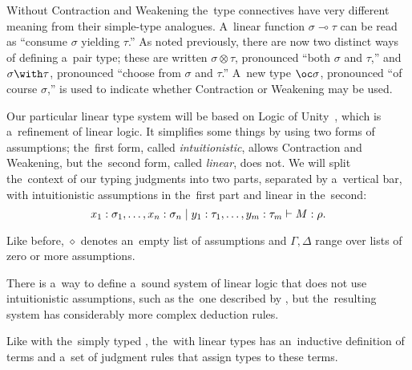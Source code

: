 Without Contraction and Weakening the~type connectives have very different
meaning from their simple-type analogues. A~linear function $\sigma \multimap
\tau$ can be read as ``consume $\sigma$ yielding $\tau$.'' As noted previously,
there are now two distinct ways of defining a~pair type; these are written
$\sigma \otimes \tau$, pronounced ``both $\sigma$ and $\tau$,'' and $\sigma
\with \tau$, pronounced ``choose from $\sigma$ and $\tau$.'' A~new type
$\oc \sigma$, pronounced ``of course $\sigma$,'' is used to indicate whether
Contraction or Weakening may be used.


Our particular linear type system will be based on Logic of
Unity~\citep{girard_1993}, which is a~refinement of linear logic. It simplifies
some things by using two forms of assumptions; the~first form, called
\emph{intuitionistic}, allows Contraction and Weakening, but the~second form,
called \emph{linear}, does not. We will split the~context of our typing
judgments into two parts, separated by a~vertical bar, with intuitionistic
assumptions in the~first part and linear in the~second:
\[
  x_1 \overset{}: \sigma_1, \dotsc, x_n \overset{}: \sigma_n \mid y_1 \overset{}: \tau_1, \dotsc,
    y_m \overset{}: \tau_m \vdash M \overset{}: \rho.
\]

Like before, $\diamond$ denotes an~empty list of assumptions and $\Gamma,
\Delta$ range over lists of zero or more assumptions.

There is a~way to define a~sound system of linear logic that does not use
intuitionistic assumptions, such as the~one described by
\citet{benton_et_al_1993}, but the~resulting system has considerably more
complex deduction rules.

Like with the~simply typed \lc, the~\lc with linear types has an~inductive
definition of terms and a~set of judgment rules that assign types to these
terms.

